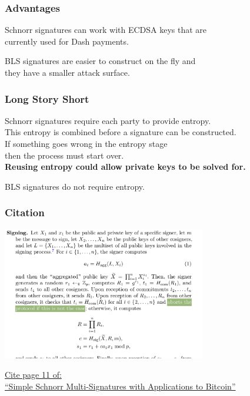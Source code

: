 \documentclass[english,handout]{beamer}
\begin{document}
\begin{frame}
\frametitle{Advantages}
\vfill
\begin{center}
Schnorr signatures can work with ECDSA keys that are \\currently used for Dash payments.
\end{center}
\pause
\vfill
\begin{center}
BLS signatures are easier to construct on the fly and \\
they have a smaller attack surface.
\end{center}
\vfill
\end{frame}

\begin{frame}
\frametitle{Long Story Short}
\vfill
\begin{center}
Schnorr signatures require each party to provide entropy.\\
This entropy is combined before a signature can be constructed. \\
If something goes wrong in the entropy stage  \\
then the process must start over.  \\
{\bf Reusing entropy could allow private keys to be solved for.}
\end{center}
\vfill
\begin{center}
BLS signatures do not require entropy.
\end{center}
\vfill
\end{frame}

\begin{frame}
\frametitle{Citation}
\begin{center}
\includegraphics[width=3.5in]{aborts.png}
\end{center}

\href{https://eprint.iacr.org/2018/068.pdf}{Cite page 11 of:\\
``Simple Schnorr Multi-Signatures with Applications to Bitcoin''}

\end{frame}
\end{document}
